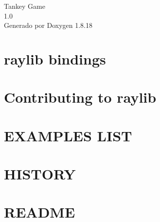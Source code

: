 \let\mypdfximage\pdfximage\def\pdfximage{\immediate\mypdfximage}\documentclass[twoside]{book}
\newcommand{\+}{\discretionary{\mbox{\scriptsize$\hookleftarrow$}}{}{}}
\newcommand{\clearemptydoublepage}{%
  \newpage{\pagestyle{empty}\cleardoublepage}%
}
\begin{document}
\hypersetup{pageanchor=false,
             bookmarksnumbered=true,
             pdfencoding=unicode
            }
\begin{titlepage}
\vspace*{7cm}
\begin{center}%
{\Large Tankey Game \\[1ex]\large 1.\+0 }\\
\vspace*{1cm}
{\large Generado por Doxygen 1.8.18}\\
\end{center}
\end{titlepage}
\clearemptydoublepage
{}
\tableofcontents
\clearemptydoublepage
{}
\hypersetup{pageanchor=true}

\chapter{raylib bindings}
\label{md_cmake-build-debug__deps_raylib-src__b_i_n_d_i_n_g_s}

\chapter{Contributing to raylib}
\label{md_cmake-build-debug__deps_raylib-src__c_o_n_t_r_i_b_u_t_i_n_g}

\chapter{E\+X\+A\+M\+P\+L\+ES L\+I\+ST}
\label{md_cmake-build-debug__deps_raylib-src_examples__r_e_a_d_m_e}

\chapter{H\+I\+S\+T\+O\+RY}
\label{md_cmake-build-debug__deps_raylib-src__h_i_s_t_o_r_y}

\chapter{R\+E\+A\+D\+ME}
\label{md_cmake-build-debug__deps_raylib-src_projects__builder_examples__r_e_a_d_m_e}

\end{document}
